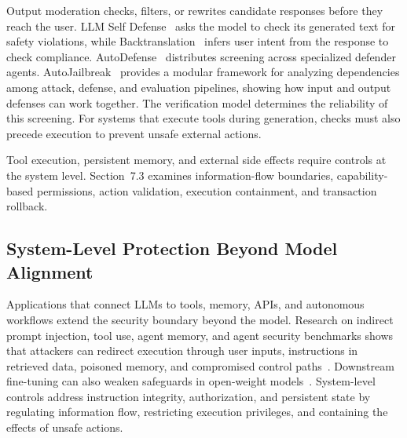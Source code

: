 \documentclass[review]{fcs}
\let\fcsOriginalCite\cite
\renewcommand{\cite}[1]{\allowbreak\fcsOriginalCite{#1}}
\newcommand{\sysYes}{\ding{51}}
\newcommand{\sysNo}{\ding{55}}
\begin{document}
Output moderation checks, filters, or rewrites candidate responses before they reach the user. LLM Self Defense~\cite{phute2023llmselfdefense} asks the model to check its generated text for safety violations, while Backtranslation~\cite{wang2024backtranslation} infers user intent from the response to check compliance. AutoDefense~\cite{zeng2024autodefense} distributes screening across specialized defender agents. AutoJailbreak~\cite{lu2024autojailbreak} provides a modular framework for analyzing dependencies among attack, defense, and evaluation pipelines, showing how input and output defenses can work together. The verification model determines the reliability of this screening. For systems that execute tools during generation, checks must also precede execution to prevent unsafe external actions.

Tool execution, persistent memory, and external side effects require controls at the system level. Section~7.3 examines information-flow boundaries, capability-based permissions, action validation, execution containment, and transaction rollback.

\subsection{System-Level Protection Beyond Model Alignment}

Applications that connect LLMs to tools, memory, APIs, and autonomous workflows extend the security boundary beyond the model. Research on indirect prompt injection, tool use, agent memory, and agent security benchmarks shows that attackers can redirect execution through user inputs, instructions in retrieved data, poisoned memory, and compromised control paths~\cite{perez2022promptinject,abdelnabi2023indirect,debenedetti2024agentdojo,chen2024agentpoison,zhang2025asb}. Downstream fine-tuning can also weaken safeguards in open-weight models~\cite{qi2023finetuningalignedlanguagemodels,yang2023shadowalignment}. System-level controls address instruction integrity, authorization, and persistent state by regulating information flow, restricting execution privileges, and containing the effects of unsafe actions.

\providecommand{\sysYes}{\ding{51}}
\providecommand{\sysNo}{\ding{55}}
\end{document}

